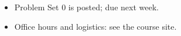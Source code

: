 \begin{itemize}
  \item Problem Set 0 is posted; due next week.
  \item Office hours and logistics: see the course site.
\end{itemize}
